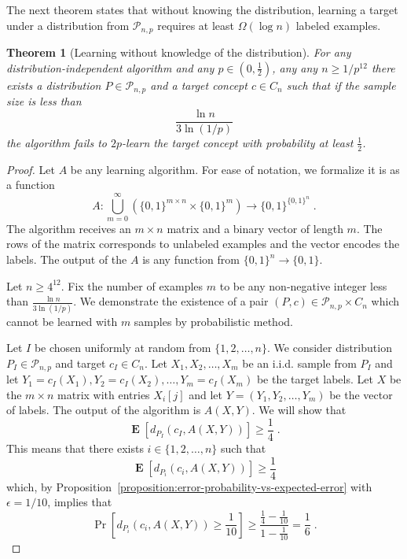 \documentclass[10pt]{article}
\newtheorem{theorem}[proposition]{Theorem}
\renewcommand{\P}{\mathcal{P}}
\DeclareMathOperator{\Exp}{\mathbf{E}}
\begin{document}
The next theorem states that without knowing the distribution,
learning a target under a distribution from $\P_{n,p}$
requires at least $\Omega(\log n)$ labeled examples.

\begin{theorem}[Learning without knowledge of the distribution]
For any distribution-independent algorithm and any $p \in (0,\frac{1}{2})$,
any any $n \ge 1/p^{12}$
there exists a distribution $P \in \P_{n,p}$ and a target
concept $c \in C_n$ such that if the sample size is less than
$$
\frac{\ln n}{3 \ln (1/p)}
$$
the algorithm fails to $2p$-learn the
target concept with probability at least $\frac{1}{2}$.
\end{theorem}

\begin{proof}
Let $A$ be any learning algorithm. For ease of notation, we formalize it is as a function
$$
A:\bigcup_{m=0}^\infty \left(\{0,1\}^{m \times n} \times \{0,1\}^m\right) \to \{0,1\}^{\{0,1\}^n} \; .
$$
The algorithm receives an $m \times n$ matrix and a binary vector of length $m$.
The rows of the matrix corresponds to unlabeled examples and the vector encodes
the labels. The output of the $A$ is any function from $\{0,1\}^n \to \{0,1\}$.

Let $n \ge 4^{12}$. Fix the number of examples $m$ to be any non-negative integer less than
$\frac{\ln n}{3 \ln(1/p)}$. We demonstrate the existence of a pair $(P,c) \in
\P_{n,p} \times C_n$ which cannot be learned with $m$ samples by probabilistic method.

Let $I$ be chosen uniformly at random from $\{1,2,\dots,n\}$. We consider distribution
$P_I \in \P_{n,p}$ and target $c_I \in C_n$. Let $X_1, X_2, \dots, X_m$ be an
i.i.d. sample from $P_I$ and let $Y_1 = c_I(X_1), Y_2 = c_I(X_2), \dots, Y_m =
c_I(X_m)$ be the target labels. Let $X$ be the $m \times n$ matrix with entries
$X_i[j]$ and let $Y = (Y_1, Y_2, \dots, Y_m)$ be the vector of labels. The
output of the algorithm is $A(X,Y)$. We will show that
\begin{equation}
\label{equation:failure-probability}
\Exp \left[d_{P_I}(c_I, A(X,Y)) \right] \ge \frac{1}{4} \; .
\end{equation}
This means that there exists $i \in \{1,2,\dots,n\}$ such that
$$
\Exp \left[d_{P_i}(c_i, A(X,Y)) \right] \ge \frac{1}{4}
$$
which, by Proposition~\ref{proposition:error-probability-vs-expected-error} with $\epsilon=1/10$, implies that
$$
\Pr \left[ d_{P_i}(c_i, A(X,Y)) \ge \frac{1}{10} \right] \ge \frac{\frac{1}{4} - \frac{1}{10}}{1 - \frac{1}{10}} = \frac{1}{6} \; .
$$


\end{proof}
\end{document}
